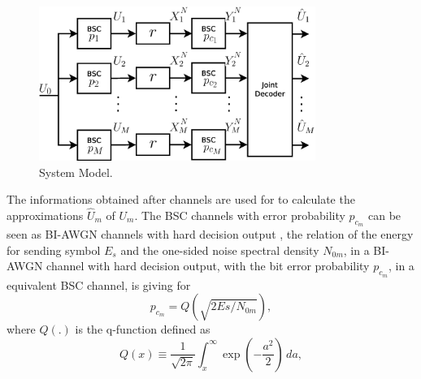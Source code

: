 \documentclass[journal]{IEEEtran}
\begin{document}
\begin{figure}[h!bt]
\centering
\includegraphics[width=9.0cm]{fig1.eps}
\caption{System Model.} \label{fig:modelo}
\end{figure}

The informations obtained after channels are used for to calculate the 
approximations $\hat{U}_m$ of $U_m$. The BSC channels with error probability 
$p_{c_m}$ can be seen as BI-AWGN channels with hard decision output \cite{cover}, 
the relation of the energy for sending symbol $E_s$ and  the one-sided noise spectral 
density $N_{0m}$, in a BI-AWGN channel with hard decision output, with the  bit 
error probability $p_{c_m}$, in a equivalent BSC channel, is giving for
\begin{equation} \label{eq:pc}
p_{c_m}=Q(\sqrt{2 Es/ N_{0m}}),
\end{equation}
where $Q(.)$ is the q-function defined as
\begin{equation} \label{eq:Qsigma_}
Q(x) \equiv \frac{1}{\sqrt{2\pi}} \int_x^\infty \exp\left(-\frac{a^2}{2}\right) \, da,
\end{equation}
\end{document}
